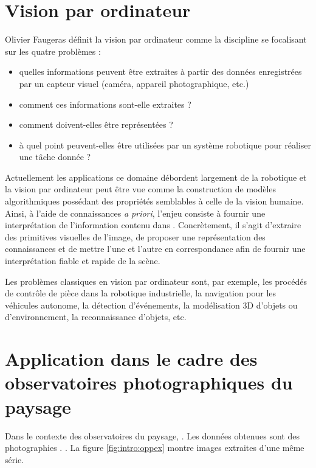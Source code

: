 \section{Vision par ordinateur}
Olivier Faugeras \cite{faugeras1993three} définit la vision par ordinateur comme la discipline se focalisant  sur les quatre problèmes  :

\begin{itemize}
\item quelles informations peuvent être extraites à partir des données enregistrées par un capteur visuel (caméra, appareil photographique, etc.)
\item comment ces informations sont-elle extraites ?
\item comment doivent-elles être représentées ? 
\item à quel point peuvent-elles être utilisées par un système robotique pour réaliser une tâche donnée ? 
\end{itemize}

Actuellement les applications  ce domaine débordent largement de la robotique et la vision par ordinateur peut être vue comme la construction de modèles algorithmiques possédant des propriétés semblables à celle de la vision humaine. Ainsi, à l'aide  de connaissances \textit{a priori}, l'enjeu consiste à fournir une interprétation de l'information contenu dans . Concrètement, il s'agit d'extraire des primitives visuelles de l'image, de proposer une représentation des connaissances et de mettre l'une et l'autre en correspondance afin de fournir une interprétation fiable  et rapide de la scène. 

Les problèmes classiques en vision par ordinateur sont, par exemple, les procédés de contrôle de pièce dans la robotique industrielle, la navigation pour les véhicules autonome, la détection d’événements, la modélisation 3D d'objets ou d'environnement, la reconnaissance d'objets, etc.


\section{Application dans le cadre des observatoires photographiques du paysage}

Dans le contexte des observatoires du paysage, . Les données obtenues sont  des photographies . . La figure \ref{fig:intro:oppex} montre  images extraites d'une même série.

